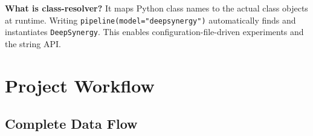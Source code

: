 \documentclass[12pt,a4paper,oneside]{book}
\begin{document}
\begin{tcolorbox}[notebox]
\textbf{What is class-resolver?} It maps Python class names to the actual class objects at runtime. Writing \texttt{pipeline(model="deepsynergy")} automatically finds and instantiates \texttt{DeepSynergy}. This enables configuration-file-driven experiments and the string API.
\end{tcolorbox}
\chapter{Project Workflow}\label{chap:workflow}

\section{Complete Data Flow}
\end{document}
